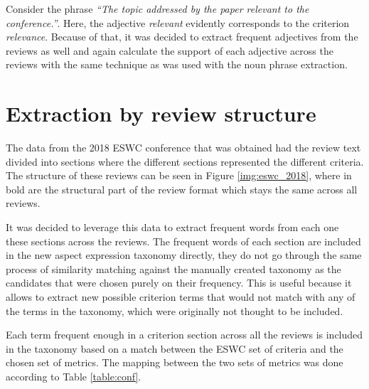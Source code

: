 Consider the phrase \textit{``The topic addressed by the paper relevant to the conference.''}. Here, the adjective \textit{relevant} evidently corresponds to the criterion \textit{relevance}. Because of that, it was decided to extract frequent adjectives from the reviews as well and again calculate the support of each adjective across the reviews with the same technique as was used with the noun phrase extraction. 
\section{Extraction by review structure}
The data from the 2018 ESWC conference that was obtained had the review text divided into sections where the different sections represented the different criteria. The structure of these reviews can be seen in Figure \ref{img:eswc_2018}, where in bold are the structural part of the review format which stays the same across all reviews. 

It was decided to leverage this data to extract frequent words from each one these sections across the reviews. 
The frequent words of each section are included in the new aspect expression taxonomy directly, they do not go through the same process of similarity matching against the manually created taxonomy as the candidates that were chosen purely on their frequency. This is useful because it allows to extract new possible criterion terms that would not match with any of the terms in the taxonomy, which were originally not thought to be included.

Each term frequent enough in a criterion section across all the reviews is included in the taxonomy based on a match between the ESWC set of criteria and the chosen set of metrics. The mapping between the two sets of metrics was done according to Table \ref{table:conf}.

